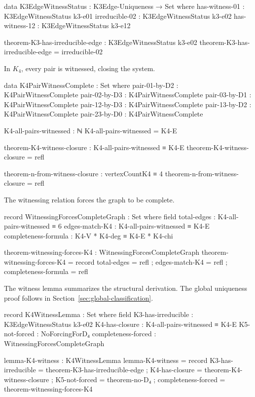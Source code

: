 \documentclass[11pt,a4paper]{book}
\begin{document}
\begin{code}
data K3EdgeWitnessStatus : K3Edge-Uniqueness → Set where
  has-witness-01  : K3EdgeWitnessStatus k3-e01
  irreducible-02  : K3EdgeWitnessStatus k3-e02
  has-witness-12  : K3EdgeWitnessStatus k3-e12

theorem-K3-has-irreducible-edge : K3EdgeWitnessStatus k3-e02
theorem-K3-has-irreducible-edge = irreducible-02
\end{code}

In $K_4$, every pair is witnessed, closing the system.

\begin{code}
data K4PairWitnessComplete : Set where
  pair-01-by-D2 : K4PairWitnessComplete
  pair-02-by-D3 : K4PairWitnessComplete
  pair-03-by-D1 : K4PairWitnessComplete
  pair-12-by-D3 : K4PairWitnessComplete
  pair-13-by-D2 : K4PairWitnessComplete
  pair-23-by-D0 : K4PairWitnessComplete

K4-all-pairs-witnessed : ℕ
K4-all-pairs-witnessed = K4-E

theorem-K4-witness-closure : K4-all-pairs-witnessed ≡ K4-E
theorem-K4-witness-closure = refl

theorem-n-from-witness-closure : vertexCountK4 ≡ 4
theorem-n-from-witness-closure = refl
\end{code}

The witnessing relation forces the graph to be complete.

\begin{code}
record WitnessingForcesCompleteGraph : Set where
  field
    total-edges : K4-all-pairs-witnessed ≡ 6
    edges-match-K4 : K4-all-pairs-witnessed ≡ K4-E
    completeness-formula : K4-V * K4-deg ≡ K4-E * K4-chi

theorem-witnessing-forces-K4 : WitnessingForcesCompleteGraph
theorem-witnessing-forces-K4 = record
  { total-edges = refl
  ; edges-match-K4 = refl
  ; completeness-formula = refl
  }
\end{code}

The witness lemma summarizes the structural derivation. The global uniqueness proof follows in Section~\ref{sec:global-classification}.

\begin{code}
record K4WitnessLemma : Set where
  field
    K3-has-irreducible   : K3EdgeWitnessStatus k3-e02
    K4-has-closure       : K4-all-pairs-witnessed ≡ K4-E
    K5-not-forced        : NoForcingForD₄
    completeness-forced  : WitnessingForcesCompleteGraph

lemma-K4-witness : K4WitnessLemma
lemma-K4-witness = record
  { K3-has-irreducible  = theorem-K3-has-irreducible-edge
  ; K4-has-closure      = theorem-K4-witness-closure
  ; K5-not-forced       = theorem-no-D₄
  ; completeness-forced = theorem-witnessing-forces-K4
  }
\end{code}
\end{document}
